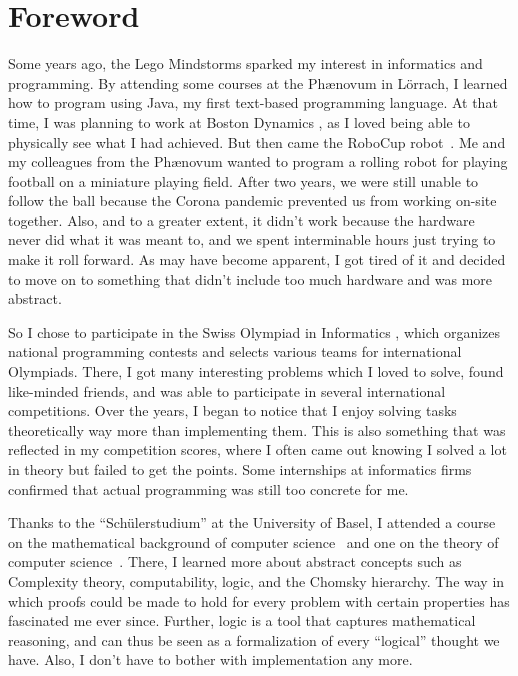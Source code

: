 \chapter*{Foreword}

Some years ago, the Lego Mindstorms \cite{lego} sparked my interest in informatics and programming.
By attending some courses at the Phænovum \cite{phaenovum} in Lörrach, I learned how to program using Java, my first text-based programming language.
At that time, I was planning to work at Boston Dynamics \cite{boston}, as I loved being able to physically see what I had achieved.
But then came the RoboCup robot~\cite{roboCup}.
Me and my colleagues from the Phænovum wanted to program a rolling robot for playing football on a miniature playing field.
After two years, we were still unable to follow the ball because the Corona pandemic prevented us from working on-site together.
Also, and to a greater extent, it didn't work because the hardware never did what it was meant to, and we spent interminable hours just trying to make it roll forward.
As may have become apparent, I got tired of it and decided to move on to something that didn't include too much hardware and was more abstract.

So I chose to participate in the Swiss Olympiad in Informatics \cite{soi}, which organizes national programming contests and selects various teams for international Olympiads.
There, I got many interesting problems which I loved to solve, found like-minded friends, and was able to participate in several international competitions.
Over the years, I began to notice that I enjoy solving tasks theoretically way more than implementing them.
This is also something that was reflected in my competition scores, where I often came out knowing I solved a lot in theory but failed to get the points.
Some internships at informatics firms confirmed that actual programming was still too concrete for me.

Thanks to the ``Schülerstudium'' at the University of Basel, I attended a course on the mathematical background of computer science~\cite{discrete-maths} and one on the theory of computer science~\cite{theory-cs}.
There, I learned more about abstract concepts such as Complexity theory, computability, logic, and the Chomsky hierarchy.
The way in which proofs could be made to hold for every problem with certain properties has fascinated me ever since.
Further, logic is a tool that captures mathematical reasoning, and can thus be seen as a formalization of every ``logical'' thought we have.
Also, I don't have to bother with implementation any more.

